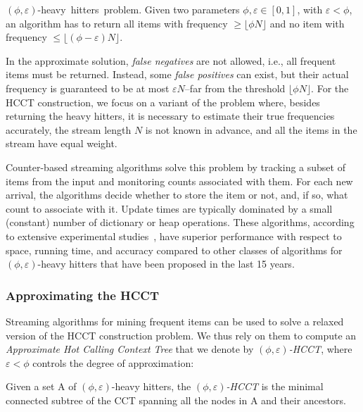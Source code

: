 \begin{definition} 
{\mbox{$(\phi,\varepsilon)$-heavy hitters problem.}} Given two parameters $\phi,\varepsilon\in[0,1]$, with $\varepsilon<\phi$, an algorithm has to return all items with frequency $\ge\lfloor\phi N\rfloor$ and no item with frequency $\le\lfloor(\phi-\varepsilon) N\rfloor$.
\end{definition} 

\noindent In the approximate solution, {\em false negatives} are not allowed, i.e., all frequent items must be returned. Instead, some {\em false positives} can exist, but their actual frequency is guaranteed to be at most $\varepsilon N$--far from the threshold $\lfloor\phi N\rfloor$. For the HCCT construction, we focus on a variant of the problem where, besides returning the heavy hitters, it is necessary to estimate their true frequencies accurately, the stream length $N$ is not known in advance, and all the items in the stream have equal weight.

Counter-based streaming algorithms solve this problem by tracking a subset of items from the input and monitoring counts associated with them. For each new arrival, the algorithms decide whether to store the item or not, and, if so, what count to associate with it. Update times are typically dominated by a small (constant) number of dictionary or heap operations. These algorithms, according to extensive experimental studies~\cite{Cormode08,Manerikar09}, have superior performance with respect to space, running time, and accuracy compared to other classes of algorithms for $(\phi,\varepsilon)$-heavy hitters
that have been proposed in the last 15 years.

\subsubsection*{Approximating the HCCT}
Streaming algorithms for mining frequent items can be used to solve a relaxed version of the HCCT construction problem. We thus rely on them to compute an {\em Approximate Hot Calling Context Tree} that we denote by {\em $(\phi,\varepsilon)$-HCCT}, where $\varepsilon<\phi$ controls the degree of approximation:

\begin{definition}
Given a set A of $(\phi,\varepsilon)$-heavy hitters, the {\em $(\phi,\varepsilon)$-HCCT} is the minimal connected subtree of the CCT spanning all the nodes in A and their ancestors.
\end{definition}

